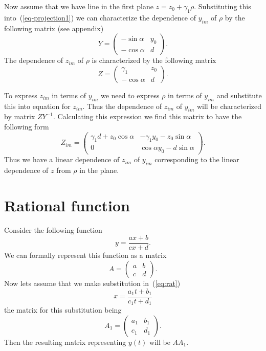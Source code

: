 \documentclass{article}
\begin{document}
Now assume that we have line in the first plane $z=z_0+\gamma_1\rho$. Substituting this into~(\ref{eq-projection1}) we can characterize the dependence of $y_{im}$ of $\rho$ by the following matrix (see appendix) 
\begin{equation}
 Y= \left(
    \begin{array}{ll}
      -\sin\alpha  & y_0 \\
      -\cos\alpha  & d
    \end{array}
  \right).
\end{equation}
The dependence of $z_{im}$ of $\rho$ is characterized by the following matrix
\begin{equation}
  Z=\left(
    \begin{array}{ll}
      \gamma_1  & z_0 \\
      -\cos\alpha  & d
    \end{array}
  \right).
\end{equation}

To express $z_{im}$ in terms of $y_{im}$ we need to express $\rho$ in terms of $y_{im}$ and substitute this into equation for $z_{im}$. Thus the dependence of $z_{im}$ of $y_{im}$ will be characterized by matrix $Z Y^{-1}$. Calculating this expression we find this matrix to have the following form
\begin{equation}
  Z_{im}= \left(
    \begin{array}{ll}
      \gamma_1 d + z_0 \cos\alpha  & -\gamma_1 y_0 -z_0 \sin\alpha\\
      0  & \cos\alpha y_0 - d\sin\alpha
    \end{array}
  \right).
\end{equation}
Thus we have a linear dependence of $z_{im}$ of $y_{im}$ corresponding to the linear dependence of $z$ from $\rho$ in the plane. 
  

 
  

\appendix
\section{Rational function}
Consider the following function
\begin{equation}
\label{eq:rat}
y = \frac{a x + b}{c x +d }.
\end{equation} 
We can formally represent this function as a matrix
\begin{equation}
A = \left(
  \begin{array}{ll}
    a  & b \\
    c  & d 
  \end{array}
\right).
\end{equation}
Now lets assume that we make substitution in~(\ref{eq:rat})
\[ x = \frac{ a_1 t + b_1 } { c_1 t +d_1} \] the matrix for this substitution being
\begin{equation}
A_1 = \left(
  \begin{array}{ll}
    a_1  & b_1 \\
    c_1  & d_1 
  \end{array}
\right).
\end{equation}
Then the resulting matrix representing $y(t)$ will be $A A_1$.
\end{document}
